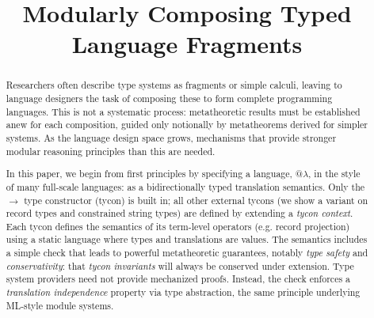 \documentclass[10pt,preprint]{sigplanconf}
\begin{document}
\conferenceinfo{-}{-} 
\copyrightyear{-} 
\copyrightdata{[to be supplied]} 


\title{Modularly Composing Typed Language Fragments}

\authorinfo{}{}{}

\maketitle
\begin{abstract}
Researchers often describe type systems as fragments or simple calculi, leaving to language designers the task of composing these to form complete programming  languages.  %
This is not a systematic process: metatheoretic results must be established anew for each composition, guided only notionally by metatheorems derived for simpler systems.
As the language design space grows, mechanisms that provide stronger modular reasoning principles than this are needed.%


In this paper, we begin from first principles by specifying a language, @$\lambda$, in the style of many full-scale languages: as a bidirectionally typed translation semantics. Only the $\rightarrow$ type constructor (tycon) is built in; all other external tycons (we show a variant on record types and constrained string types) are defined by extending a \emph{tycon context}. Each tycon defines the semantics of its  term-level operators (e.g. record projection) using a static language where types and translations are values. The semantics includes a simple check that leads to powerful metatheoretic guarantees, notably \emph{type safety} and \emph{conservativity}: that  \emph{tycon invariants} will always be conserved under extension. Type system providers need not provide mechanized proofs. Instead, the check enforces a \emph{translation independence} property via type abstraction, the same principle underlying ML-style module systems.
\end{abstract}
\end{document}
